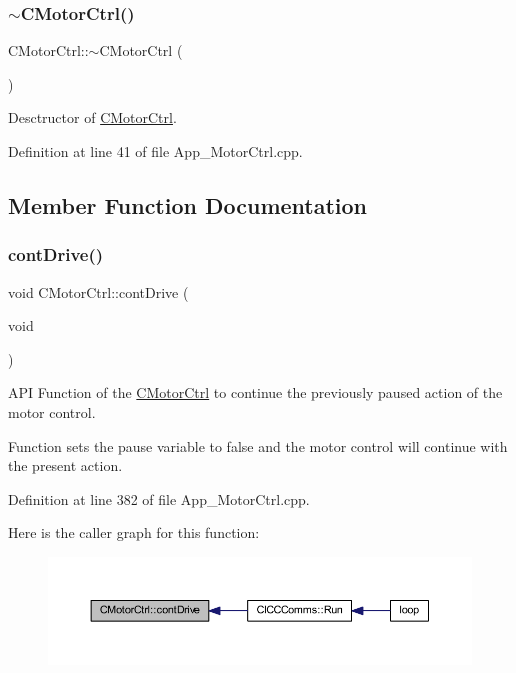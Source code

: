 \subsubsection{\texorpdfstring{$\sim$\+C\+Motor\+Ctrl()}{~CMotorCtrl()}}
{\footnotesize\ttfamily C\+Motor\+Ctrl\+::$\sim$\+C\+Motor\+Ctrl (\begin{DoxyParamCaption}{ }\end{DoxyParamCaption})}



Desctructor of \mbox{\hyperlink{class_c_motor_ctrl}{C\+Motor\+Ctrl}}. 



Definition at line 41 of file App\+\_\+\+Motor\+Ctrl.\+cpp.



\subsection{Member Function Documentation}
\mbox{\label{class_c_motor_ctrl_a6b67180c355c2acf76d641f2817db66d}} 
\subsubsection{\texorpdfstring{cont\+Drive()}{contDrive()}}
{\footnotesize\ttfamily void C\+Motor\+Ctrl\+::cont\+Drive (\begin{DoxyParamCaption}\item[{void}]{ }\end{DoxyParamCaption})}



A\+PI Function of the \mbox{\hyperlink{class_c_motor_ctrl}{C\+Motor\+Ctrl}} to continue the previously paused action of the motor control. 

Function sets the pause variable to false and the motor control will continue with the present action. 

Definition at line 382 of file App\+\_\+\+Motor\+Ctrl.\+cpp.

Here is the caller graph for this function\+:
\nopagebreak
\begin{figure}[H]
\begin{center}
\leavevmode
\includegraphics[width=350pt]{class_c_motor_ctrl_a6b67180c355c2acf76d641f2817db66d_icgraph}
\end{center}
\end{figure}
\mbox{\label{class_c_motor_ctrl_af4b1bec8e07e766aa2537d966f025e7a}} 
